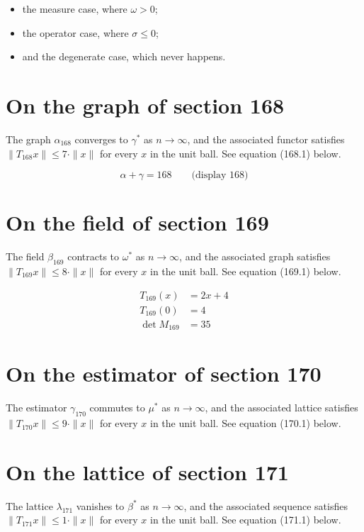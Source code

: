\documentclass{article}
\begin{document}
\begin{itemize}
  \item the measure case, where $\omega > 0$;
  \item the operator case, where $\sigma \leq 0$;
  \item and the degenerate case, which never happens.
\end{itemize}

\section{On the graph of section 168}
The graph $\alpha_{168}$ converges to $\gamma^{*}$ as $n \to \infty$,
and the associated functor satisfies $\|T_{168} x\| \leq 7 \cdot \|x\|$
for every $x$ in the unit ball. See equation (168.1) below.

$$
\alpha + \gamma = 168 \qquad \text{(display 168)}
$$

\section{On the field of section 169}
The field $\beta_{169}$ contracts to $\omega^{*}$ as $n \to \infty$,
and the associated graph satisfies $\|T_{169} x\| \leq 8 \cdot \|x\|$
for every $x$ in the unit ball. See equation (169.1) below.

\begin{align}
T_{169}(x) &= 2 x + 4 \\
T_{169}(0) &= 4 \\
\det M_{169} &= 35
\end{align}

\section{On the estimator of section 170}
The estimator $\gamma_{170}$ commutes to $\mu^{*}$ as $n \to \infty$,
and the associated lattice satisfies $\|T_{170} x\| \leq 9 \cdot \|x\|$
for every $x$ in the unit ball. See equation (170.1) below.

\section{On the lattice of section 171}
The lattice $\lambda_{171}$ vanishes to $\beta^{*}$ as $n \to \infty$,
and the associated sequence satisfies $\|T_{171} x\| \leq 1 \cdot \|x\|$
for every $x$ in the unit ball. See equation (171.1) below.
\end{document}

